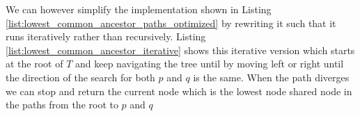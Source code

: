 \begin{minipage}{\linewidth}
	
\end{minipage}


We can however simplify the implementation shown in Listing
\ref{list:lowest_common_ancestor_paths_optimized} by rewriting it such that it runs iteratively
rather than recursively. Listing \ref{list:lowest_common_ancestor_iterative} shows this iterative version which starts at the root of $T$
and keep navigating the tree until by moving left or right until the direction of the search for
both $p$ and $q$ is the same. When the path diverges we can stop and return the current node which
is the lowest node shared node in the paths from the root to $p$ and $q$

\begin{minipage}{\linewidth}
	
\end{minipage}
